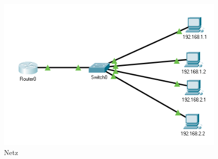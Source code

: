 \begin{figure}[!htb]
    \centering
    \includegraphics[width=\textwidth,height=.5\textwidth,keepaspectratio]{./img/aufbau.png}
    \caption{Netz}
\end{figure}
